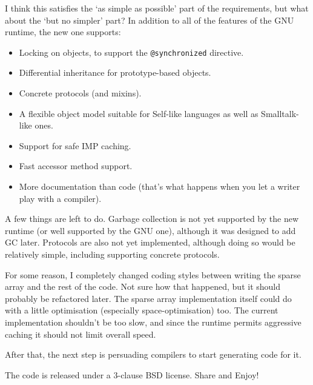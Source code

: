 \documentclass[10pt]{article}
\newcommand{\code}[1]{\lstinline|#1|}
\begin{document}
			I think this satisfies the `as simple as possible' part of the requirements, but what about the `but no simpler' part?  In addition to all of the features of the GNU runtime, the new one supports:

			\begin{itemize}
				\item Locking on objects, to support the \code{@synchronized} directive.
				\item Differential inheritance for prototype-based objects.
				\item Concrete protocols (and mixins).
				\item A flexible object model suitable for Self-like languages as well as Smalltalk-like ones.
				\item Support for safe IMP caching.
				\item Fast accessor method support.
				\item More documentation than code (that's what happens when you let a writer play with a compiler).
			\end{itemize}

			A few things are left to do.  Garbage collection is not yet supported by the new runtime (or well supported by the GNU one), although it was designed to add GC later.  Protocols are also not yet implemented, although doing so would be relatively simple, including supporting concrete protocols.  

			For some reason, I completely changed coding styles between writing the sparse array and the rest of the code.  Not sure how that happened, but it should probably be refactored later.  The sparse array implementation itself could do with a little optimisation (especially space-optimisation) too.  The current implementation shouldn't be too slow, and since the runtime permits aggressive caching it should not limit overall speed.
			
			After that, the next step is persuading compilers to start generating code for it.

			The code is released under a 3-clause BSD license.  Share and Enjoy!
\end{document}
